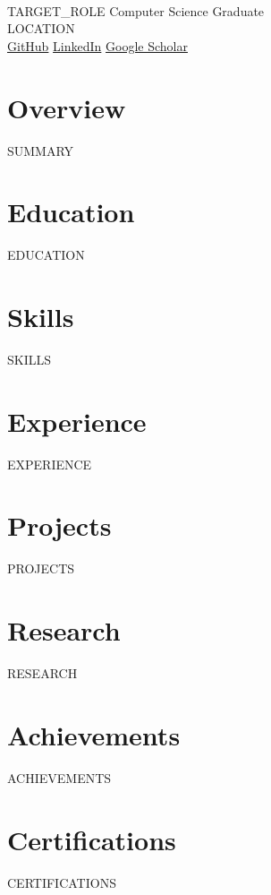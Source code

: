 \documentclass[a4paper, 10pt]{article}
\begin{document}
\begin{center}
    {\Huge \textbf{}} \\
    \vspace{0.1cm}
    {\small {{TARGET_ROLE}} \textemdash{} Computer Science Graduate} \\
    \vspace{0.1cm}
    {\small \href{mailto:{{EMAIL}}}{} \textemdash{} \href{tel:{{PHONE}}}{} \textemdash{} {{LOCATION}}} \\
    {\small \href{{{PORTFOLIO}}}{} \textemdash{} \href{{{GITHUB}}}{\color{accentcolor}GitHub} \textemdash{} \href{{{LINKEDIN}}}{\color{accentcolor}LinkedIn} \textemdash{} \href{{{GOOGLE_SCHOLAR}}}{\color{accentcolor}Google Scholar}}
\end{center}

\vspace{-0.2cm}
\section*{Overview}
{{SUMMARY}}

\vspace{0.2cm}
\noindent
\begin{minipage}[t]{0.48\textwidth}
\section*{Education}
{{EDUCATION}}

\section*{Skills}
{{SKILLS}}

\section*{Experience}
{{EXPERIENCE}}
\end{minipage}
\hfill
\begin{minipage}[t]{0.48\textwidth}
\section*{Projects}
{{PROJECTS}}

\section*{Research}
{{RESEARCH}}

\section*{Achievements}
{{ACHIEVEMENTS}}

\section*{Certifications}
{{CERTIFICATIONS}}
\end{minipage}
\end{document}
